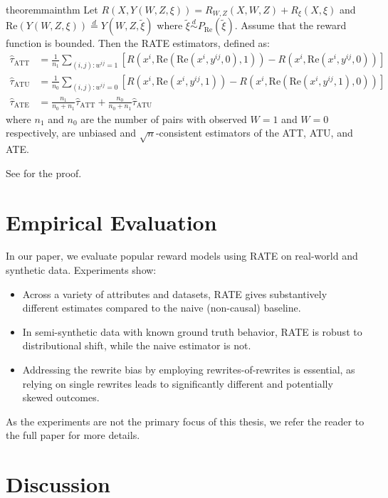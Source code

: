 \documentclass{article}
\theoremstyle{definition}
\newcommand{\equaldist}{\stackrel{d}{=}}
\newcommand{\dist}{\stackrel{d}{\sim}}
\begin{document}
\begin{restatable}{theorem}{mainthm}
\label{thm:mainthm}
  Let $R(X, Y(W,Z,\xi)) = R_{W, Z}(X, W, Z) + R_{\xi}(X, \xi)$ and $\text{Re}(Y(W, Z, \xi)) \equaldist Y(W, Z, \tilde{\xi})$ where $\tilde{\xi} \dist P_\text{Re}(\tilde{\xi})$. Assume that the reward function is bounded.
  Then the RATE estimators, defined as:
  \begin{align*}
  \hat{\tau}_{\text{ATT}} &= \frac{1}{n_1} \sum_{(i, j): w^{ij} = 1} [R(x^i, \text{Re}(\text{Re}(x^i, y^{ij}, 0), 1)) - R(x^i, \text{Re}(x^i, y^{ij}, 0))] \\
  \hat{\tau}_{\text{ATU}} &= \frac{1}{n_0} \sum_{(i,j): w^{ij} = 0} [R(x^i, \text{Re}(x^i, y^{ij}, 1)) - R(x^i, \text{Re}(\text{Re}(x^i, y^{ij}, 1), 0))] \\
  \hat{\tau}_{\text{ATE}} &= \frac{n_1}{n_0 + n_1} \hat{\tau}_{\text{ATT}} + \frac{n_0}{n_0 + n_1} \hat{\tau}_{\text{ATU}}
\end{align*}
where $n_1$ and $n_0$ are the number of pairs with observed $W = 1$ and $W = 0$ respectively, are unbiased and $\sqrt{n}$-consistent estimators of the ATT, ATU, and ATE.
\end{restatable}
See  for the proof.

\section{Empirical Evaluation}
In our paper, we evaluate popular reward models using RATE on real-world and synthetic data. Experiments show:
\begin{itemize}
  \item Across a variety of attributes and datasets, RATE gives substantively different estimates compared to the naive (non-causal) baseline.
  \item In semi-synthetic data with known ground truth behavior, RATE is robust to distributional shift, while the naive estimator is not.
  \item Addressing the rewrite bias by employing rewrites-of-rewrites is essential, as relying on single rewrites leads to significantly different and potentially skewed outcomes.
\end{itemize}
As the experiments are not the primary focus of this thesis, we refer the reader to the full paper for more details.

\section{Discussion}
\label{sec:discussion}
\end{document}
